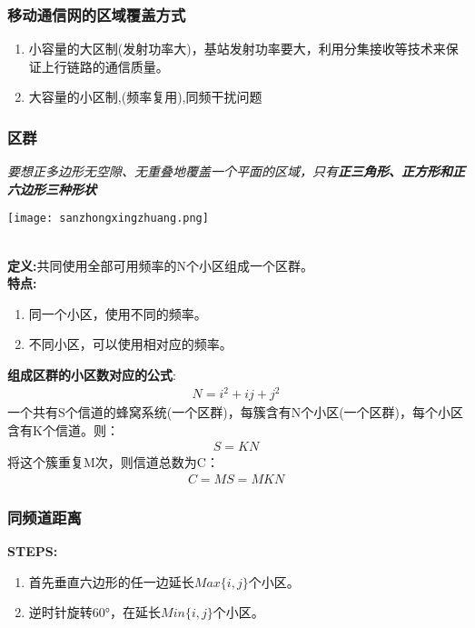 	\subsubsection{移动通信网的区域覆盖方式}
	\begin{enumerate}
		\item 小容量的大区制(发射功率大)，基站发射功率要大，利用分集接收等技术来保证上行链路的通信质量。
		\item  大容量的小区制,(频率复用),同频干扰问题
	\end{enumerate}
	\subsubsection{区群}
	\begin{minipage}{0.4\linewidth}
	\textit{要想正多边形无空隙、无重叠地覆盖一个平面的区域，只有\textbf{正三角形、正方形和正六边形三种形状}}
	\end{minipage}
	\begin{minipage}{0.4\linewidth}
		\centering
		\texttt{[image: sanzhongxingzhuang.png]}
	\end{minipage}\\
	 \textbf{定义:}共同使用全部可用频率的N个小区组成一个区群。\\
	 \textbf{特点:}
	 \begin{enumerate}
	 	\item 同一个小区，使用不同的频率。
	 	\item 不同小区，可以使用相对应的频率。
	 \end{enumerate}
 	\textbf{组成区群的小区数对应的公式}:
 	\begin{eqnarray}
 		N = i^2+ij+j^2
 	\end{eqnarray}
	一个共有S个信道的蜂窝系统(一个区群)，每簇含有N个小区(一个区群)，每个小区含有K个信道。则：
	\begin{eqnarray}
		S = KN
	\end{eqnarray}
	将这个簇重复M次，则信道总数为C：
	\begin{eqnarray}
	C = MS = MKN
	\end{eqnarray}
	\subsubsection{同频道距离}
	\textbf{STEPS:}
	\begin{enumerate}
		\item 首先垂直六边形的任一边延长$Max\{i,j\}$个小区。
		\item 逆时针旋转60°，在延长$Min\{i,j\}$个小区。
	\end{enumerate}

